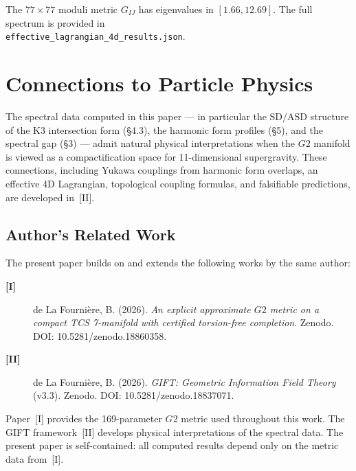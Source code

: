 \documentclass[11pt,a4paper]{article}
\newcommand{\Gtwo}{\mathrm{G}_2}
\newcommand{\SD}{\mathrm{SD}}
\newcommand{\ASD}{\mathrm{ASD}}
\theoremstyle{remark}
\def\Gtwo{G2}%
\begin{document}
The $77 \times 77$ moduli metric $G_{IJ}$ has eigenvalues in $[1.66, 12.69]$.
The full spectrum is provided in\\
\texttt{effective\_lagrangian\_4d\_results.json}.

\section{Connections to Particle Physics}

The spectral data computed in this paper --- in particular the $\SD/\ASD$ structure of
the K3 intersection form (\S4.3), the harmonic form profiles (\S5), and the spectral
gap (\S3) --- admit natural physical interpretations when the $\Gtwo$ manifold is viewed as
a compactification space for 11-dimensional supergravity. These connections,
including Yukawa couplings from harmonic form overlaps, an effective 4D Lagrangian,
topological coupling formulas, and falsifiable predictions, are developed in~[II].

\subsection*{Author's Related Work}

\noindent The present paper builds on and extends the following works by the same author:

\begin{description}
\item[\textbf{[I]}] de La Fourni\`ere, B. (2026).
\textit{An explicit approximate $\Gtwo$ metric on a compact TCS 7-manifold with certified torsion-free completion}.
Zenodo. DOI: 10.5281/zenodo.18860358.

\item[\textbf{[II]}] de La Fourni\`ere, B. (2026).
\textit{GIFT: Geometric Information Field Theory} (v3.3).
Zenodo. DOI: 10.5281/zenodo.18837071.
\end{description}

\noindent Paper~[I] provides the 169-parameter $\Gtwo$ metric used throughout this work.
The GIFT framework~[II] develops physical interpretations of the spectral data.
The present paper is self-contained: all computed results depend only on the metric data from~[I].
\end{document}
